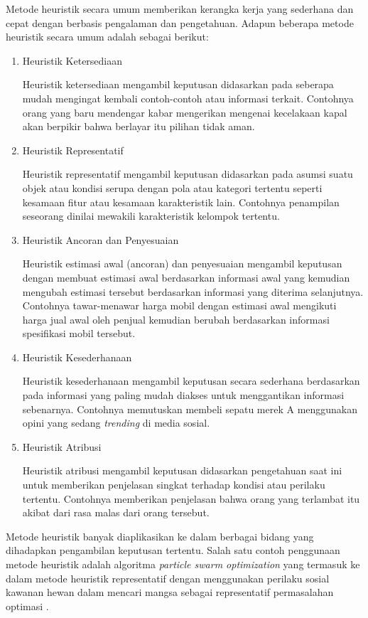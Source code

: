 {    Metode heuristik secara umum memberikan kerangka kerja yang sederhana dan cepat dengan berbasis pengalaman dan pengetahuan.
    Adapun beberapa metode heuristik secara umum adalah sebagai berikut:
    \begin{enumerate}[align=left, left = 0mm, nolistsep]
        \item Heuristik Ketersediaan \par \nobreak
              Heuristik ketersediaan mengambil keputusan didasarkan pada seberapa mudah mengingat kembali contoh-contoh atau informasi terkait.
              Contohnya orang yang baru mendengar kabar mengerikan mengenai kecelakaan kapal akan berpikir bahwa berlayar itu pilihan tidak aman.
        \item Heuristik Representatif \par \nobreak
              Heuristik representatif mengambil keputusan didasarkan pada asumsi suatu objek atau kondisi serupa dengan pola atau kategori tertentu seperti kesamaan fitur atau kesamaan karakteristik lain.
              Contohnya penampilan seseorang dinilai mewakili karakteristik kelompok tertentu.
        \item Heuristik Ancoran dan Penyesuaian \par \nobreak
              Heuristik estimasi awal (ancoran) dan penyesuaian mengambil keputusan dengan membuat estimasi awal berdasarkan informasi awal yang kemudian mengubah estimasi tersebut berdasarkan informasi yang diterima selanjutnya.
              Contohnya tawar-menawar harga mobil dengan estimasi awal mengikuti harga jual awal oleh penjual kemudian berubah berdasarkan informasi spesifikasi mobil tersebut.
        \item Heuristik Kesederhanaan \par \nobreak
              Heuristik kesederhanaan mengambil keputusan secara sederhana berdasarkan pada informasi yang paling mudah diakses untuk menggantikan informasi sebenarnya.
              Contohnya memutuskan membeli sepatu merek A menggunakan opini yang sedang \textit{trending} di media sosial.
        \item Heuristik Atribusi \par \nobreak
              Heuristik atribusi mengambil keputusan didasarkan pengetahuan saat ini untuk memberikan penjelasan singkat terhadap kondisi atau perilaku tertentu.
              Contohnya memberikan penjelasan bahwa orang yang terlambat itu akibat dari rasa malas dari orang tersebut.
    \end{enumerate}

    \noindent
    Metode heuristik banyak diaplikasikan ke dalam berbagai bidang yang dihadapkan pengambilan keputusan tertentu.
    Salah satu contoh penggunaan metode heuristik adalah algoritma \textit{particle swarm optimization} yang termasuk ke dalam metode heuristik representatif dengan menggunakan
    perilaku sosial kawanan hewan dalam mencari mangsa sebagai representatif permasalahan optimasi .
}
\vspace{-3mm}


